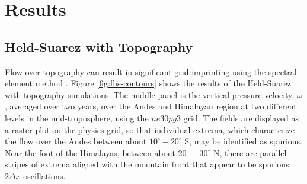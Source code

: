\documentclass{agujournal}
\begin{document}
\section{Results}\label{sec:results}

\subsection{Held-Suarez with Topography}\label{sec:hs94}

Flow over topography can result in significant grid imprinting using the spectral element method \citep[][H18]{gmdd-8-4623-2015}. Figure \ref{fig:fhs-contours} shows the results of the Held-Suarez with topography simulations. The middle panel is the vertical pressure velocity, $\omega$, averaged over two years, over the Andes and Himalayan region at two different levels in the mid-troposphere, using the $ne30pg3$ grid. The fields are displayed as a raster plot on the physics grid, so that individual extrema, which characterize the flow over the Andes between about $10^\circ-20^\circ$ S, may be identified as spurious. Near the foot of the Himalayas, between about $20^\circ-30^\circ$ N, there are parallel stripes of extrema aligned with the mountain front that appear to be spurious $2\Delta x$ oscillations.
\end{document}
